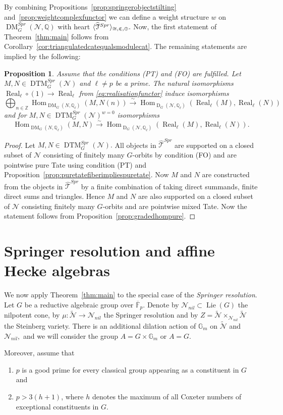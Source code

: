 \documentclass{amsart}
\theoremstyle{plain}
\newtheorem{proposition}[theorem]{Proposition}
\theoremstyle{TheoremNum}
\theoremstyle{definition}
\theoremstyle{remark}
\numberwithin{equation}{section}
\newcommand{\F}{\mathbb{F}}
\newcommand{\Q}{\mathbb{Q}}
\newcommand{\Z}{\mathbb{Z}}
\newcommand{\M}{\widetilde{\mathcal{N}}}
\newcommand{\N}{\mathcal{N}}
\newcommand{\Nnil}{\mathcal{N}_{nil}}
\newcommand{\Tt}{\mathcal{T}}
\newcommand{\DM}{\operatorname{DM}}
\newcommand{\DTM}{\operatorname{DTM}}
\newcommand{\Hom}{\operatorname{Hom}}
\newcommand{\Real}{\operatorname{Real}}
\newcommand{\DerG}{\operatorname{D}}
\begin{document}
By combining Propositions~\ref{prop:springerobjectstilting} and~\ref{prop:weightcomplexfunctor} we can define a weight structure $w$ on 
$\DM^{Spr}_G(\N,\Q)$ with heart
$\langle\widehat{\Tt}^{Spr}\rangle_{\cong, \inplus,\oplus}.$ Now, the first statement of Theorem~\ref{thm:main} follows from Corollary~\ref{cor:triangulatedcatequalsmodulecat}. The remaining statements are implied by the following:
\begin{proposition} Assume that the conditions (PT) and (FO) are fulfilled.  Let $M,N\in \DTM^{Spr}_G(\N)$ and $\ell\neq p$ be a prime. The natural isomorphisms $\Real_\ell\circ(1)\to\Real_\ell$ from \eqref{eq:realisationfunctor} induce  isomorphisms
$$\bigoplus_{n\in\Z}\Hom_{\DM_G(N,\Q_\ell)}(M,N(n))\stackrel{\sim}{\to} \Hom_{\DerG_G(\N,\Q_\ell)}(\Real_\ell(M),\Real_\ell(N))$$ and for $M,N\in\DTM^{Spr}_G(\N)^{w=0}$ isomorphisms $$\Hom_{\DM_G(N,\Q_\ell)}(M,N)\stackrel{\sim}{\to}\Hom_{\DerG_G(\N,\Q_\ell)}(\Real_\ell(M),\Real_\ell(N)).$$
\end{proposition}
\begin{proof}
Let $M,N\in\DTM^{Spr}_G(\N).$ All objects in $\widehat{\Tt}^{Spr}$ are supported on a closed subset of $\N$ consisting of finitely many $G$-orbits by condition (FO) and are pointwise pure Tate using condition (PT) and Proposition~\ref{prop:puretatefiberimpliespuretate}. Now $M$ and $N$ are constructed from the objects in $\widehat{\Tt}^{Spr}$ by a finite combination of taking direct summands, finite direct sums and triangles. Hence $M$ and $N$ are also supported on a closed subset of $\N$ consisting finitely many $G$-orbits and are pointwise mixed Tate. Now the statement follows from Proposition~\ref{prop:gradedhompure}. 
\end{proof}
\section{Springer resolution and affine Hecke algebras} \label{sec:heckealgebra}
We now apply Theorem~\ref{thm:main} to the special case of the \emph{Springer resolution}. 
Let $G$ be a reductive algebraic group over $\overline{\F}_p.$ Denote by $\Nnil\subset\operatorname{Lie}(G)$ the nilpotent cone, by $\mu:\M\to\Nnil$ the Springer resolution and by $Z=\M\times_{\Nnil}\M$ the Steinberg variety. There is an additional dilation action of $\mathbb{G}_m$ on $\M$ and $\Nnil,$ and we will consider the group $A=G\times \mathbb{G}_m$ or $A=G.$

Moreover, assume that 
\begin{enumerate}
    \item $p$ is a good prime for every classical group appearing as a constituent in $G$ and
    \item $p > 3(h + 1)$, where $h$ denotes the maximum of all Coxeter numbers of exceptional constituents in $G.$
\end{enumerate}
\end{document}
